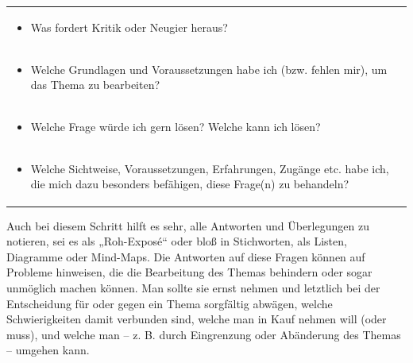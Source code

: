 \documentclass[]{book}
\providecommand{\tightlist}{%
  \setlength{\itemsep}{0pt}\setlength{\parskip}{0pt}}
\theoremstyle{definition}
\theoremstyle{definition}
\theoremstyle{definition}
\theoremstyle{remark}
\begin{document}
\begin{longtable}[]{@{}l@{}}
\begin{minipage}[t]{0.97\columnwidth}
\begin{itemize}
\tightlist
\item
  Was fordert Kritik oder Neugier heraus? \vspace{-6mm}
\end{itemize}\strut
\end{minipage}\tabularnewline
\begin{minipage}[t]{0.97\columnwidth}\raggedright\strut
\begin{itemize}
\tightlist
\item
  Welche Grundlagen und Voraussetzungen habe ich (bzw. fehlen mir), um
  das Thema zu bearbeiten? \vspace{-6mm}
\end{itemize}\strut
\end{minipage}\tabularnewline
\begin{minipage}[t]{0.97\columnwidth}\raggedright\strut
\begin{itemize}
\tightlist
\item
  Welche Frage würde ich gern lösen? Welche kann ich lösen?
  \vspace{-6mm}
\end{itemize}\strut
\end{minipage}\tabularnewline
\begin{minipage}[t]{0.97\columnwidth}\raggedright\strut
\begin{itemize}
\tightlist
\item
  Welche Sichtweise, Voraussetzungen, Erfahrungen, Zugänge etc. habe
  ich, die mich dazu besonders befähigen, diese Frage(n) zu behandeln?
\end{itemize}\strut
\end{minipage}\tabularnewline
\bottomrule
\end{longtable}

Auch bei diesem Schritt hilft es sehr, alle Antworten und Überlegungen
zu notieren, sei es als „Roh-Exposé`` oder bloß in Stichworten, als
Listen, Diagramme oder Mind-Maps. Die Antworten auf diese Fragen können
auf Probleme hinweisen, die die Bearbeitung des Themas behindern oder
sogar unmöglich machen können. Man sollte sie ernst nehmen und letztlich
bei der Entscheidung für oder gegen ein Thema sorgfältig abwägen, welche
Schwierigkeiten damit verbunden sind, welche man in Kauf nehmen will
(oder muss), und welche man -- z. B. durch Eingrenzung oder Abänderung
des Themas -- umgehen kann.
\end{document}
